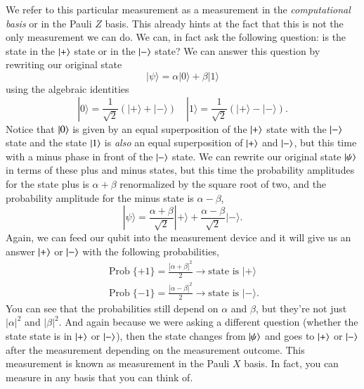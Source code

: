 We refer to this particular measurement as a measurement in the \emph{computational basis} or in the Pauli $Z$ basis. This already hints at the fact that this is not the only measurement we can do. We can, in fact ask the following question: is the state in the $\left| + \right\rangle$ state or in the $\left| - \right\rangle$ state? We can answer this question by rewriting our original state
\begin{equation}
|\psi\rangle=\alpha|0\rangle+\beta|1\rangle
\end{equation}
using the algebraic identities
\begin{equation}
|0\rangle=\frac{1}{\sqrt{2}}(|+\rangle+|-\rangle) \quad|1\rangle=\frac{1}{\sqrt{2}}(|+\rangle-|-\rangle).
\end{equation}
Notice that $\left| 0 \right\rangle$ is given by an equal superposition of the $\left| + \right\rangle$ state with the $\left| - \right\rangle$ state and the state $\left| 1 \right\rangle$ is \emph{also} an equal superposition of $\left| + \right\rangle$ and $\left| - \right\rangle$, but this time with a minus phase in front of the $\left| - \right\rangle$ state. We can rewrite our original state $\left| \psi \right\rangle$ in terms of these plus and minus states, but this time the probability amplitudes for the state plus is $\alpha+\beta$ renormalized by the square root of two, and the probability amplitude for the minus state is $\alpha-\beta$,
\begin{equation}
|\psi\rangle=\frac{\alpha+\beta}{\sqrt{2}}|+\rangle+\frac{\alpha-\beta}{\sqrt{2}}|-\rangle.
\end{equation}
Again, we can feed our qubit into the measurement device and it will give us an answer $\left| + \right\rangle$ or $\left| - \right\rangle$ with the following probabilities,
\begin{align}
\operatorname{Prob}\{+1\}=\frac{|\alpha+\beta|^2}{2} \rightarrow \textrm{state is } |+\rangle \\
\operatorname{Prob}\{-1\}=\frac{|\alpha-\beta|^2}{2} \rightarrow \textrm{state is } |-\rangle.
\end{align}
You can see that the probabilities still depend on $\alpha$ and $\beta$, but they're not just $|\alpha|^2$ and $|\beta|^2$.
And again because we were asking a different question (whether the state state is in $\left| + \right\rangle$ or $\left| - \right\rangle$), then the state changes from $\left| \psi \right\rangle$ and goes to $\left| + \right\rangle$ or $\left| - \right\rangle$ after the measurement depending on the measurement outcome. This measurement is known as measurement in the Pauli $X$ basis.  In fact, you can measure in any basis that you can think of.  

